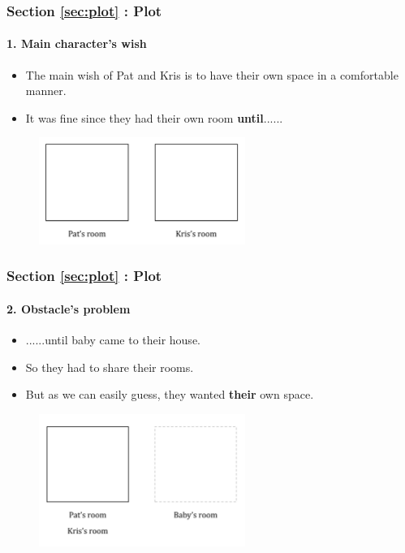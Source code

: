 \documentclass{beamer}
\begin{document}
	\begin{frame}
		\frametitle{Section \ref{sec:plot} : Plot}
		\framesubtitle{1. Main character's wish}
		\begin{itemize}
			\item The main wish of Pat and Kris is {\color{cyan} to have their own space in a comfortable manner}.
			\item It was fine since they had their own room {\bf until}......
		\end{itemize}
		\begin{figure}
			\centering
			\includegraphics[width=0.6\textwidth]{res/room1_cropped.pdf}
		\end{figure}
	\end{frame}
	
	\begin{frame}
		\frametitle{Section \ref{sec:plot} : Plot}
		\framesubtitle{2. Obstacle's problem}
		\begin{itemize}
			\item ......until baby came to their house.
			\item So they had to share their rooms.
			\item But as we can easily guess, they wanted {\bf their} own space. 
		\end{itemize}
		\begin{figure}
			\centering
			\includegraphics[width=0.6\textwidth]{res/room2_cropped.pdf}
		\end{figure}
	\end{frame}
	
\end{document}

